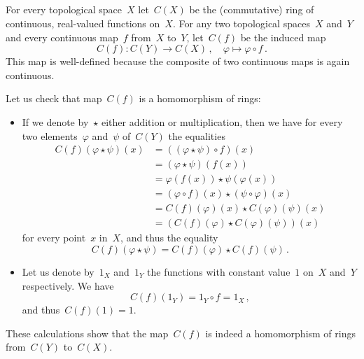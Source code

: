 \subsection{}

For every topological space~$X$ let~$C(X)$ be the (commutative) ring of continuous, real-valued functions on~$X$.
For any two topological spaces~$X$ and~$Y$ and every continuous map~$f$ from~$X$ to~$Y$, let~$C(f)$ be the induced map
\[
	C(f)
	\colon
	C(Y) \to C(X) \,,
	\quad
	φ \mapsto φ ∘ f \,.
\]
This map is well-defined because the composite of two continuous maps is again continuous.

Let us check that map~$C(f)$ is a homomorphism of rings:
\begin{itemize}

	\item
		If we denote by~$⋆$ either addition or multiplication, then we have for every two elements~$φ$ and~$ψ$ of~$C(Y)$ the equalities
		\begin{align*}
			C(f)(φ ⋆ ψ)(x)
			&=
			((φ ⋆ ψ) ∘ f)(x)
			\\
			&=
			(φ ⋆ ψ)(f(x))
			\\
			&=
			φ(f(x)) ⋆ ψ(φ(x))
			\\
			&=
			(φ ∘ f)(x) ⋆ (ψ ∘ φ)(x)
			\\
			&=
			C(f)(φ)(x) ⋆ C(φ)(ψ)(x)
			\\
			&=
			(C(f)(φ) ⋆ C(φ)(ψ))(x)
		\end{align*}
		for every point~$x$ in~$X$, and thus the equality
		\[
			C(f)(φ ⋆ ψ) = C(f)(φ) ⋆ C(f)(ψ) \,.
		\]

	\item
		Let us denote by~$1_X$ and~$1_Y$ the functions with constant value~$1$ on~$X$ and~$Y$ respectively.
		We have
		\[
			C(f)(1_Y)
			=
			1_Y ∘ f
			=
			1_X \,,
		\]
		and thus~$C(f)(1) = 1$.

\end{itemize}
These calculations show that the map~$C(f)$ is indeed a homomorphism of rings from~$C(Y)$ to~$C(X)$.

